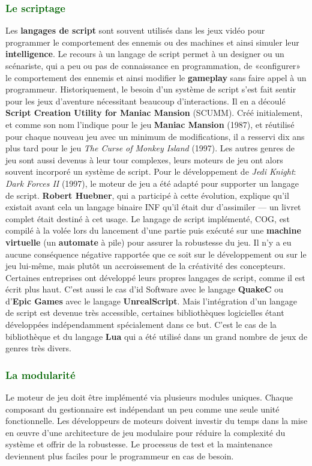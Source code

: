 \documentclass[ebook, 8pt, oneside, openany]{memoir}
\begin{document}
	\subsubsection{\textcolor{darkgreen}{Le scriptage}}
	Les \textbf{langages de script} sont souvent utilisés dans les jeux vidéo pour programmer le
	comportement des ennemis ou des machines et ainsi simuler leur \textbf{intelligence}. Le recours à un
	langage de script permet à un designer ou un scénariste, qui a peu ou pas de connaissance en
	programmation, de «configurer» le comportement des ennemis et ainsi modifier le \textbf{gameplay} sans 
	faire appel à un programmeur. Historiquement, le besoin d'un système de script s'est fait sentir pour
	les jeux d'aventure nécessitant beaucoup d'interactions. Il en a découlé \textbf{Script Creation Utility
	for Maniac Mansion} (SCUMM). Créé initialement, et comme son nom l'indique pour le jeu \textbf{Maniac
	Mansion} (1987), et réutilisé pour chaque nouveau jeu avec un minimum de modifications, il a resservi
	dix ans plus tard pour le jeu \textit{The Curse of Monkey Island} (1997). Les autres genres de jeu sont
	aussi devenus à leur tour complexes, leurs moteurs de jeu ont alors souvent incorporé un système de
	script. Pour le développement de \textit{Jedi Knight}: \textit{Dark Forces II} (1997), le moteur de jeu
	a été adapté pour supporter un langage de script. \textbf{Robert Huebner}, qui a participé à cette
	évolution, explique qu'il existait avant cela un langage binaire INF qu'il était dur d'assimiler — un
	livret complet était destiné à cet usage. Le langage de script implémenté, COG, est compilé à la volée
	lors du lancement d'une partie puis exécuté sur une \textbf{machine virtuelle} (un \textbf{automate} à
	pile) pour assurer la robustesse du jeu. Il n'y a eu aucune conséquence négative rapportée que ce soit
	sur le développement ou sur le jeu lui-même, mais plutôt un accroissement de la créativité des
	concepteurs. Certaines entreprises ont développé leurs propres langages de script, comme il est écrit
	plus haut. C'est aussi le cas d'id Software avec le langage \textbf{QuakeC} ou d'\textbf{Epic Games}
	avec le langage \textbf{UnrealScript}. Mais l'intégration d'un langage de script est devenue très
	accessible, certaines bibliothèques logicielles étant développées indépendamment spécialement dans ce
	but. C'est le cas de la bibliothèque et du langage \textbf{Lua} qui a été utilisé dans un grand nombre
	de jeux de genres très divers.
	\subsubsection{\textcolor{darkgreen}{La modularité}}
	Le moteur de jeu doit être implémenté via plusieurs modules uniques. Chaque composant du gestionnaire
	est indépendant un peu comme une seule unité fonctionnelle. Les développeurs de moteurs doivent investir
	du temps dans la mise en œuvre d'une architecture de jeu modulaire pour réduire la complexité du système
	et offrir de la robustesse. Le processus de test et la maintenance deviennent plus faciles pour le
	programmeur en cas de besoin.
\end{document}
